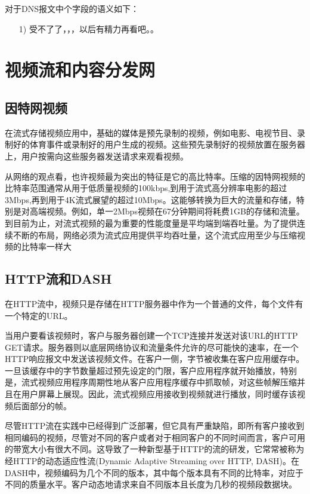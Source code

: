     对于DNS报文中个字段的语义如下：

\begin{itemize}
    \item [1)] 受不了了，，，以后有精力再看吧。。
\end{itemize}

\section{视频流和内容分发网}

\subsection{因特网视频}

    在流式存储视频应用中，基础的媒体是预先录制的视频，例如电影、电视节目、录制好的体育事件或录制好的用户生成的视频。这些预先录制好的视频放置在服务器上，用户按需向这些服务器发送请求来观看视频。

    从网络的观点看，也许视频最为突出的特征是它的高比特率。压缩的因特网视频的比特率范围通常从用于低质量视频的100kbps,到用于流式高分辨率电影的超过3Mbps,再到用于4K流式展望的超过10Mbps。这能够转换为巨大的流量和存储，特别是对高端视频。例如，单一2Mbps视频在67分钟期间将耗费1GB的存储和流量。到目前为止，对流式视频的最为重要的性能度量是平均端到端吞吐量。为了提供连续不断的布局，网络必须为流式应用提供平均吞吐量，这个流式应用至少与压缩视频的比特率一样大

\subsection{HTTP流和DASH}

    在HTTP流中，视频只是存储在HTTP服务器中作为一个普通的文件，每个文件有一个特定的URL。

    当用户要看该视频时，客户与服务器创建一个TCP连接并发送对该URL的HTTP GET请求。服务器则以底层网络协议和流量条件允许的尽可能快的速率，在一个HTTP响应报文中发送该视频文件。在客户一侧，字节被收集在客户应用缓存中。一旦该缓存中的字节数量超过预先设定的门限，客户应用程序就开始播放，特别是，流式视频应用程序周期性地从客户应用程序缓存中抓取帧，对这些帧解压缩并且在用户屏幕上展现。因此，流式视频应用接收到视频就进行播放，同时缓存该视频后面部分的帧。

    尽管HTTP流在实践中已经得到广泛部署，但它具有严重缺陷，即所有客户接收到相同编码的视频，尽管对不同的客户或者对于相同客户的不同时间而言，客户可用的带宽大小有很大不同。这导致了一种新型基于HTTP的流的研发，它常常被称为经HTTP的动态适应性流(Dynamic Adaptive Streaming over HTTP, DASH)。在DASH中，视频编码为几个不同的版本，其中每个版本具有不同的比特率，对应于不同的质量水平。客户动态地请求来自不同版本且长度为几秒的视频段数据块。

